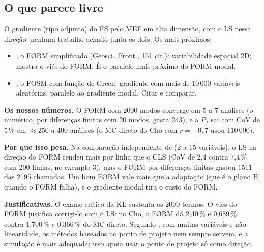 \documentclass[11pt,a4paper]{article}
\begin{document}
\subsection{O que parece livre}
O gradiente (tipo adjunto) do FS pelo MEF em alta dimensão, com o LS nessa direção: nenhum trabalho achado junta os
dois. Os mais próximos:
\begin{itemize}
  \item \citet{ji2018}, o FORM simplificado (Geosci.\ Front., 151 cit.): variabilidade espacial 2D; mostra o viés do
    FORM. É o paralelo mais próximo do FORM modal.
  \item \citet{mesquita2025}, o FOSM com função de Green: gradiente com mais de 10\,000 variáveis aleatórias, paralelo
    ao gradiente modal. Citar e comparar.
\end{itemize}
\textbf{Os nossos números.} O FORM com 2000 modos converge em 5 a 7 análises (o numérico, por diferenças finitas com 20
modos, gasta 243), e a $P_f$ sai com CoV de 5\,\% em $\approx 250$ a 400 análises (o MC direto do Cho com $r = -0{,}7$
usou 110\,000).

\textbf{Por que isso pesa.} Na comparação independente de \citet{dang2024} (2 a 15 variáveis), o LS na direção do FORM
rendeu mais por linha que o CLS (CoV de 2,4 contra 7,4\,\% com 200 linhas, no exemplo 3), mas o FORM por diferenças
finitas gastou 1511 das 2195 chamadas. Um bom FORM vale mais que a adaptação (que é o plano B quando o FORM falha), e o
gradiente modal tira o custo do FORM.

\textbf{Justificativas.} O exame crítico da KL \citep{dyson2026} sustenta os 2000 termos. O viés do FORM justifica
corrigi-lo com o LS: no Cho, o FORM dá 2,40\,\% e 0,689\,\%, contra 1,700\,\% e 0,366\,\% do MC direto. Segundo
\citet{valdebenito2010}, com muitas variáveis e não linearidade, os métodos baseados no ponto de projeto nem sempre
servem, e a simulação é mais adequada; isso apoia usar o ponto de projeto só como direção.
\end{document}
